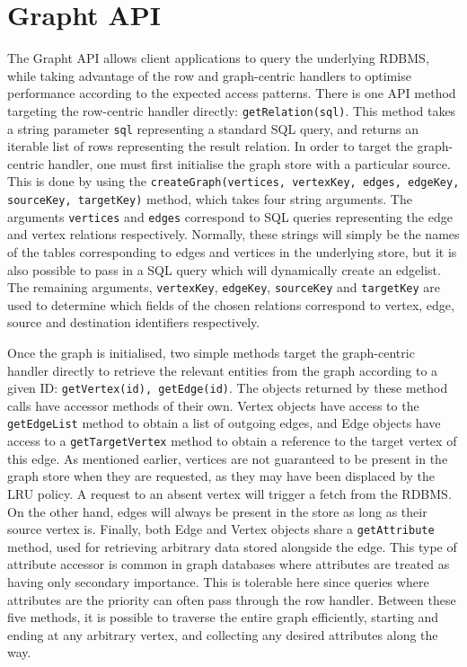 \section{Grapht API}
\label{sec:grapht_api}

The Grapht API allows client applications to query the underlying RDBMS,
while  taking advantage of the row and graph-centric handlers to optimise
performance according to the expected access patterns. There is one API method
targeting the row-centric handler directly: \texttt{getRelation(sql)}. This
method takes a string parameter \texttt{sql} representing a standard SQL
query, and returns an iterable list of rows representing the result relation.
In order to target the graph-centric handler, one must first initialise the
graph store with a particular source. This is done by using the
\texttt{createGraph(vertices, vertexKey, edges, edgeKey, sourceKey, targetKey)} method, which
takes four string arguments. The arguments \texttt{vertices} and
\texttt{edges} correspond to SQL queries representing the edge and vertex
relations respectively. Normally, these strings will simply be the names of
the tables corresponding to edges and vertices in the underlying store, but it
is also possible to pass in a SQL query which will dynamically create an
edgelist. The remaining arguments, \texttt{vertexKey}, \texttt{edgeKey}, \texttt{sourceKey} and
\texttt{targetKey} are used to determine which fields of the chosen relations
correspond to vertex, edge, source and destination identifiers respectively.

Once the graph is initialised, two simple methods target the graph-centric
handler directly to retrieve the relevant entities from the graph according to
a given ID: \texttt{getVertex(id), getEdge(id)}. The objects returned by these
method calls have accessor methods of their own. Vertex objects have access to
the \texttt{getEdgeList} method to obtain a list of outgoing edges, and Edge
objects have access to a \texttt{getTargetVertex} method to obtain a reference
to the target vertex of this edge. As mentioned earlier, vertices are not
guaranteed to be present in the graph store when they are requested, as they
may have been displaced by the LRU policy. A request to an absent vertex will
trigger a fetch from the RDBMS. On the other hand, edges will
always be present in the store as long as their source vertex is. Finally, both Edge
and Vertex objects share a \texttt{getAttribute} method, used for retrieving
arbitrary data stored alongside the edge. This type of attribute accessor is common in graph databases where attributes are treated as having only secondary importance. This is tolerable here since queries where attributes are the priority can often pass through the row handler. Between these five methods, it is
possible to traverse the entire graph efficiently, starting and ending at any
arbitrary vertex, and collecting any desired attributes along the way.

